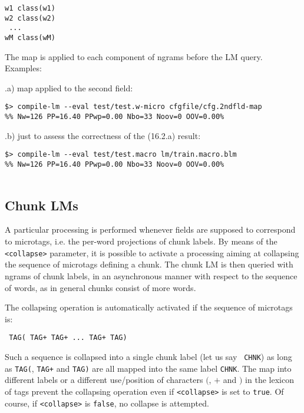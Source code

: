 \documentclass[11pt]{article}
\begin{document}
\begin{verbatim}
w1 class(w1)
w2 class(w2)
 ...
wM class(wM)
\end{verbatim}


\noindent The map is applied to each component of ngrams before the LM
query. Examples:
\bigskip

\noindent \thesubsection.a) map applied to the second field:
\begin{verbatim}
$> compile-lm --eval test/test.w-micro cfgfile/cfg.2ndfld-map
%% Nw=126 PP=16.40 PPwp=0.00 Nbo=33 Noov=0 OOV=0.00%
\end{verbatim}



\noindent \thesubsection.b) just to assess the correctness of the (16.2.a) result:
\begin{verbatim}
$> compile-lm --eval test/test.macro lm/train.macro.blm
%% Nw=126 PP=16.40 PPwp=0.00 Nbo=33 Noov=0 OOV=0.00%


\end{verbatim}


\subsection{Chunk LMs}

A particular processing is performed whenever fields are supposed to
correspond to microtags, i.e. the per-word projections of chunk labels. By
means of the {\tt <collapse>} parameter, it is possible to activate a
processing aiming at collapsing the sequence of microtags defining a
chunk. The chunk LM is then queried with ngrams of chunk labels, in an
asynchronous manner with respect to the sequence of words, as in general
chunks consist of more words.

\noindent
The collapsing operation is automatically activated if the sequence of
microtags is:

\begin{verbatim}
 TAG( TAG+ TAG+ ... TAG+ TAG)
\end{verbatim}

\noindent
Such a sequence is collapsed into a single chunk label (let us say {\tt
CHNK}) as long as {\tt TAG(}, {\tt TAG+} and {\tt TAG)} are all mapped into
the same label {\tt CHNK}. The map into different labels or a different
use/position of characters $($, $+$ and $)$ in the lexicon of tags prevent
the collapsing operation even if {\tt <collapse>} is set to {\tt true}. Of
course, if {\tt <collapse>} is {\tt false}, no collapse is attempted.
\end{document}
